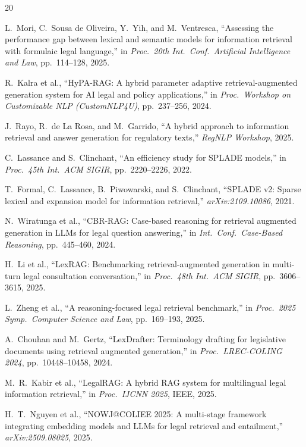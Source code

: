 \documentclass[conference]{IEEEtran}
\begin{document}
\begin{thebibliography}{20}

L.~Mori, C.~Sousa de Oliveira, Y.~Yih, and M.~Ventresca,
``Assessing the performance gap between lexical and semantic models
for information retrieval with formulaic legal language,''
in \emph{Proc.\ 20th Int.\ Conf.\ Artificial Intelligence and Law},
pp.~114--128, 2025.

R.~Kalra et al.,
``HyPA-RAG: A hybrid parameter adaptive retrieval-augmented generation
system for AI legal and policy applications,''
in \emph{Proc.\ Workshop on Customizable NLP (CustomNLP4U)},
pp.~237--256, 2024.

J.~Rayo, R.~de La Rosa, and M.~Garrido,
``A hybrid approach to information retrieval and answer generation for
regulatory texts,''
\emph{RegNLP Workshop}, 2025.

C.~Lassance and S.~Clinchant,
``An efficiency study for SPLADE models,''
in \emph{Proc.\ 45th Int.\ ACM SIGIR},
pp.~2220--2226, 2022.

T.~Formal, C.~Lassance, B.~Piwowarski, and S.~Clinchant,
``SPLADE v2: Sparse lexical and expansion model for information
retrieval,'' \emph{arXiv:2109.10086}, 2021.

N.~Wiratunga et al.,
``CBR-RAG: Case-based reasoning for retrieval augmented generation in
LLMs for legal question answering,''
in \emph{Int.\ Conf.\ Case-Based Reasoning}, pp.~445--460, 2024.

H.~Li et al.,
``LexRAG: Benchmarking retrieval-augmented generation in multi-turn
legal consultation conversation,''
in \emph{Proc.\ 48th Int.\ ACM SIGIR}, pp.~3606--3615, 2025.

L.~Zheng et al.,
``A reasoning-focused legal retrieval benchmark,''
in \emph{Proc.\ 2025 Symp.\ Computer Science and Law},
pp.~169--193, 2025.

A.~Chouhan and M.~Gertz,
``LexDrafter: Terminology drafting for legislative documents using
retrieval augmented generation,''
in \emph{Proc.\ LREC-COLING 2024}, pp.~10448--10458, 2024.

M.~R.~Kabir et al.,
``LegalRAG: A hybrid RAG system for multilingual legal information
retrieval,''
in \emph{Proc.\ IJCNN 2025}, IEEE, 2025.

H.~T.~Nguyen et al.,
``NOWJ@COLIEE 2025: A multi-stage framework integrating embedding
models and LLMs for legal retrieval and entailment,''
\emph{arXiv:2509.08025}, 2025.


\end{thebibliography}
\end{document}

